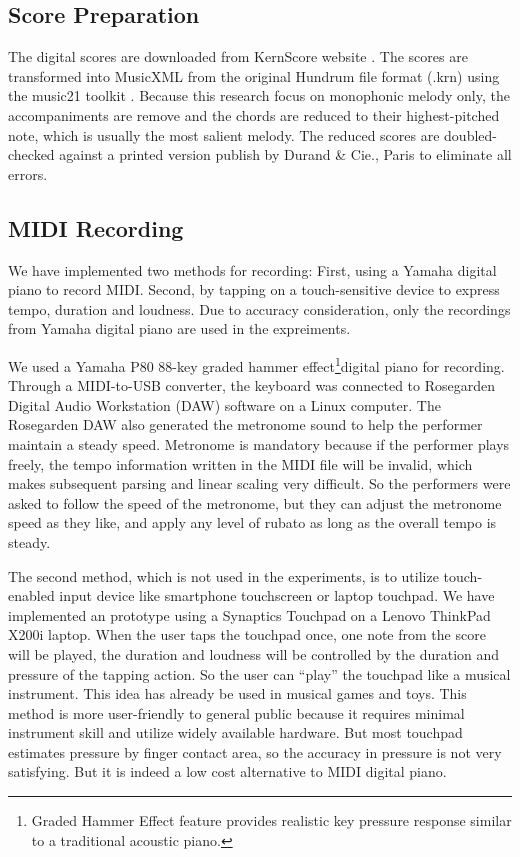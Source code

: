 \subsection{Score Preparation}

The digital scores are downloaded from KernScore website \cite{KernScores}. The  scores are transformed into MusicXML from the original Hundrum file format (.krn) using the  music21 toolkit \cite{music21}. Because this research focus on monophonic melody only, the accompaniments are remove and the chords are reduced to their highest-pitched note, which is usually the most salient melody. The reduced scores are doubled-checked against a printed version publish by Durand \& Cie., Paris \cite{Clementi1915} to eliminate all errors. %

\subsection{MIDI Recording}
We have implemented two methods for recording: First, using a Yamaha digital piano to record MIDI. Second, by tapping on a touch-sensitive device to express tempo, duration and loudness. Due to accuracy consideration, only the recordings from Yamaha digital piano are used in the expreiments.


We used a Yamaha P80 88-key graded hammer effect\footnote{Graded Hammer Effect feature provides realistic key pressure response similar to a traditional acoustic piano.}digital piano for recording. Through a MIDI-to-USB converter, the keyboard was connected to Rosegarden Digital Audio Workstation (DAW) software on a Linux computer. The Rosegarden DAW also generated the metronome sound to help the performer maintain a steady speed. Metronome is mandatory because if the performer plays freely, the tempo information written in the MIDI file will be invalid, which makes subsequent parsing and linear scaling very difficult. So the performers were asked to follow the speed of the metronome, but they can adjust the metronome speed as they like, and apply any level of rubato as long as the overall tempo is steady. 

The second method, which is not used in the experiments, is to utilize touch-enabled input device like smartphone touchscreen or laptop touchpad. We have implemented an prototype using a Synaptics Touchpad on a Lenovo ThinkPad X200i laptop. When the user taps the touchpad once, one note from the score will be played, the duration and loudness will be controlled by the duration and pressure of the tapping action. So the user can \enquote{play} the touchpad like a musical instrument. This idea has already be used in musical games and toys. This method is more user-friendly to general public because it requires minimal instrument skill and utilize widely available hardware. But most touchpad estimates pressure by finger contact area, so the accuracy in pressure is not very satisfying. But it is indeed a low cost alternative to MIDI digital piano.

